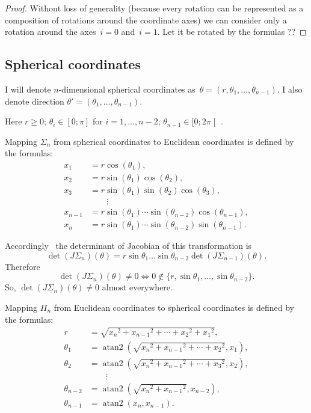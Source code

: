 \documentclass[oneside,draft]{amsart}
\begin{document}
\begin{proof}
Without loss of generality (because every rotation can be represented as a composition of rotations around the coordinate axes) we can consider only a rotation around the axes~$i=0$ and~$i=1$. Let it be rotated by the formulas ??
\end{proof}


\subsection{Spherical coordinates}

I will denote $n$-dimensional spherical coordinates as~$\theta=(r, \theta_1,\dots,\theta_{n-1})$.
I also denote direction $\theta'=(\theta_1,\dots,\theta_{n-1})$.

Here $r\geq 0$; $\theta_i\in[0;\pi]$ for $i=1,\dots,n-2$; $\theta_{n-1}\in[0;2\pi\mathclose[$ .

Mapping $\Sigma_n$ from spherical coordinates to Euclidean coordinates is defined by the formulas:
\[
\begin{aligned}x_{1}&=r\cos(\theta _{1}),\\x_{2}&=r\sin(\theta _{1})\cos(\theta _{2}),\\x_{3}&=r\sin(\theta _{1})\sin(\theta _{2})\cos(\theta _{3}),\\&\qquad \vdots \\x_{n-1}&=r\sin(\theta _{1})\cdots \sin(\theta _{n-2})\cos(\theta _{n-1}),\\x_{n}&=r\sin(\theta _{1})\cdots \sin(\theta _{n-2})\sin(\theta _{n-1}).\end{aligned}
\]

Accordingly~\cite{polar-jacobian} the determinant of Jacobian of this transformation is
\[ \det (J\Sigma_n)(\theta) = r\sin\theta_1\dots\sin\theta_{n-2}\det (J\Sigma_{n-1})(\theta). \]
Therefore
\[
\det (J\Sigma_n)(\theta)\ne 0\Leftrightarrow 0\notin\{r,\sin\theta_1,\dots,\sin\theta_{n-2}\}.
\]
So, $\det (J\Sigma_n)(\theta)\ne 0$ almost everywhere.

Mapping $\Pi_n$ from Euclidean coordinates to spherical coordinates is defined by the formulas:
\[
\begin{aligned}r&={\textstyle {\sqrt {{x_{n}}^{2}+{x_{n-1}}^{2}+\cdots +{x_{2}}^{2}+{x_{1}}^{2}}}},\\\theta _{1}&=\operatorname {atan2} \left({\textstyle {\sqrt {{x_{n}}^{2}+{x_{n-1}}^{2}+\cdots +{x_{2}}^{2}}}},x_{1}\right),\\\theta _{2}&=\operatorname {atan2} \left({\textstyle {\sqrt {{x_{n}}^{2}+{x_{n-1}}^{2}+\cdots +{x_{3}}^{2}}}},x_{2}\right),\\&\qquad \vdots \\\theta _{n-2}&=\operatorname {atan2} \left({\textstyle {\sqrt {{x_{n}}^{2}+{x_{n-1}}^{2}}}},x_{n-2}\right),\\\theta _{n-1}&=\operatorname {atan2} \left(x_{n},x_{n-1}\right).\end{aligned}
\]  
\end{document}
